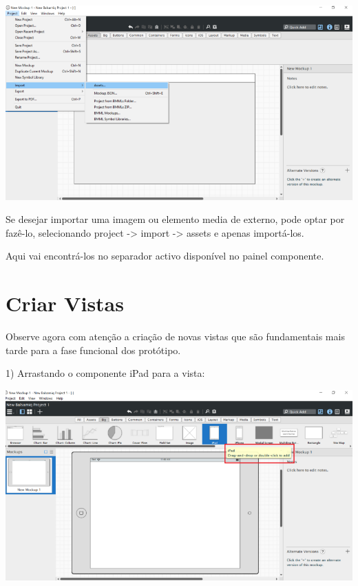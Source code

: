 \documentclass{tufte-book} %
\begin{document}
\break

\begin{center}
	\includegraphics{img10.png}
\end{center}

Se desejar importar uma imagem ou elemento media de externo, pode optar por fazê-lo, selecionando project -> import -> assets  e apenas importá-los.

Aqui vai encontrá-los no separador activo disponível no painel componente.

\chapter{Criar Vistas}

Observe agora com atenção a criação de novas vistas que são fundamentais mais tarde para a fase funcional dos protótipo.

1) Arrastando o componente iPad para a vista:

\begin{center}
	\includegraphics{img11.png}
\end{center}

\break
\end{document}
